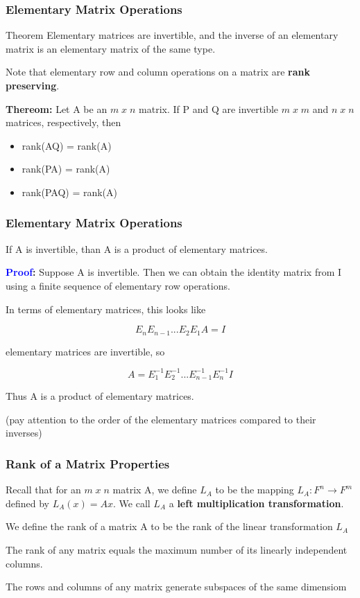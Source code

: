 \documentclass[11pt]{beamer}
\begin{document}
\begin{frame}
	\frametitle{Elementary Matrix Operations}
	\begin{block}{Theorem}
		Elementary matrices are invertible, and the inverse of an elementary matrix is an elementary matrix of the same type.
	\end{block}

	\phantom{text}
	
	Note that elementary row and column operations on a matrix are \textbf{rank preserving}.

	\phantom{text}
	
	\textbf{Thereom:} Let A be an $m \; x \; n$ matrix. If P and Q are invertible $m \; x \; m$ and $n \; x \; n$ matrices, respectively, then
		\begin{itemize}
			\item rank(AQ) = rank(A)
			\item rank(PA) = rank(A)
			\item rank(PAQ) = rank(A)
		\end{itemize}
	

\end{frame}

\begin{frame}
	\frametitle{Elementary Matrix Operations}
	If A is invertible, than A is a product of elementary matrices.
	
	\phantom{text}
	
	\textbf{\textcolor{blue}{Proof}:} Suppose A is invertible. Then we can obtain the identity matrix from I using a finite sequence of elementary row operations.
	
	In terms of elementary matrices, this looks like
	
	\[ E_{n}E_{n-1}...E_{2}E_{1}A = I \]
	
	elementary matrices are invertible, so 
	
	\[ A = E_{1}^{-1}E_{2}^{-1}...E_{n-1}^{-1}E_{n}^{-1}I \]
	
	Thus A is a product of elementary matrices.
	
	(pay attention to the order of the elementary matrices compared to their inverses)
\end{frame}

\begin{frame}
	\frametitle{Rank of a Matrix Properties}
		Recall that for an $m \; x \; n$ matrix A, we define $L_{A}$ to be the mapping $L_{A}: F^{n} \rightarrow F^{m}$ defined by $L_{A}(x) = Ax$. We call $L_{A}$ a \textbf{left multiplication transformation}.
	
	\phantom{text}
	
	We define the rank of a matrix A to be the rank of the linear transformation $L_{A}$
	
	\phantom{text}
	
	The rank of any matrix equals the maximum number of its linearly independent columns.
		
	\phantom{text}
	
	The rows and columns of any matrix generate subspaces of the same dimensiom
	
	\phantom{text}

\end{frame}
\end{document}
